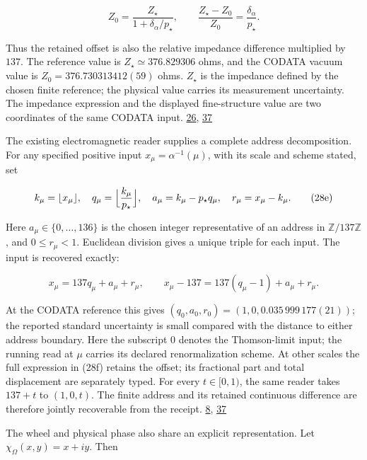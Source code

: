 \[
Z_0=\frac{Z_\star}{1+\delta_\alpha/p_\star},
\qquad
\frac{Z_\star-Z_0}{Z_0}=\frac{\delta_\alpha}{p_\star}.
\tag{28d}
\]

Thus the retained offset is also the relative impedance difference multiplied by \(137\). The reference value is \(Z_\star\simeq376.829306\) ohms, and the CODATA vacuum value is \(Z_0=376.730313412(59)\) ohms. \(Z_\star\) is the impedance defined by the chosen finite reference; the physical value carries its measurement uncertainty. The impedance expression and the displayed fine-structure value are two coordinates of the same CODATA input. \href{https://physics.nist.gov/cuu/pdf/JPCRD2022CODATA.pdf}{26}, \href{https://chatgpt.com/library?file_id=libfile_b30993b2ecd48191aab2855fdb3d932e\&account_id=personal}{37}

The existing electromagnetic reader supplies a complete address decomposition. For any specified positive input \(x_\mu=\alpha^{-1}(\mu)\), with its scale and scheme stated, set

\[
k_\mu=\lfloor x_\mu\rfloor,\quad
q_\mu=\Bigl\lfloor\frac{k_\mu}{p_\star}\Bigr\rfloor,\quad
a_\mu=k_\mu-p_\star q_\mu,\quad
r_\mu=x_\mu-k_\mu.
\tag{28e}
\]

Here \(a_\mu\in\{0,\ldots,136\}\) is the chosen integer representative of an address in \(\mathbb Z/137\mathbb Z\), and \(0\le r_\mu<1\). Euclidean division gives a unique triple for each input. The input is recovered exactly:

\[
x_\mu=137q_\mu+a_\mu+r_\mu,
\qquad
x_\mu-137=137(q_\mu-1)+a_\mu+r_\mu.
\tag{28f}
\]

At the CODATA reference this gives \((q_0,a_0,r_0)=(1,0,0.035\,999\,177(21))\); the reported standard uncertainty is small compared with the distance to either address boundary. Here the subscript \(0\) denotes the Thomson-limit input; the running read at \(\mu\) carries its declared renormalization scheme. At other scales the full expression in (28f) retains the offset; its fractional part and total displacement are separately typed. For every \(t\in[0,1)\), the same reader takes \(137+t\) to \((1,0,t)\). The finite address and its retained continuous difference are therefore jointly recoverable from the receipt. \href{https://chatgpt.com/library?file_id=libfile_67018da506648191b88970078f33fd1a\&account_id=personal}{8}, \href{https://chatgpt.com/library?file_id=libfile_b30993b2ecd48191aab2855fdb3d932e\&account_id=personal}{37}

The wheel and physical phase also share an explicit representation. Let \(\chi_\Omega(x,y)=x+iy\). Then

